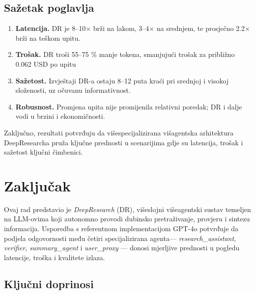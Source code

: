 \documentclass[zavrsnirad]{fer}
\begin{document}
\section{Sažetak poglavlja}
\label{sec:summary}

\begin{enumerate}[label=\arabic*.,leftmargin=1.2cm]
  \item \textbf{Latencija.} DR je 8–10× brži na lakom,
        3–4× na srednjem, te prosječno 2.2× brži na teškom upitu.
  \item \textbf{Trošak.} DR troši 55–75 \% manje tokena,
        smanjujući trošak za približno 0.062 USD po upitu
  \item \textbf{Sažetost.} Izvještaji DR-a ostaju 8–12 puta kraći
        pri srednjoj i visokoj složenosti, uz očuvanu informativnost.
  \item \textbf{Robusnost.} Promjena upita nije promijenila relativni 
        poredak; DR i dalje vodi u brzini i ekonomičnosti.
\end{enumerate}

Zaključno, rezultati potvrđuju da višespecijalizirana višagentska
arhitektura DeepResearcha pruža ključne prednosti u scenarijima gdje su
latencija, trošak i sažetost ključni čimbenici.

\chapter{Zaključak}

Ovaj rad predstavio je \emph{DeepResearch} (DR), višeslojni višeagentski sustav
temeljen na LLM-ovima koji autonomno provodi dubinsko pretraživanje,
provjeru i sintezu informacija. Usporedba s referentnom
implementacijom GPT-4o potvrđuje da podjela odgovornosti među 
četiri specijalizirana agenta— \textit{research\_assistant}, \textit{verifier}, \textit{summary\_agent} i \textit{user\_proxy} — donosi mjerljive prednosti u pogledu
latencije, troška i kvalitete izlaza.

\section{Ključni doprinosi}
\end{document}
